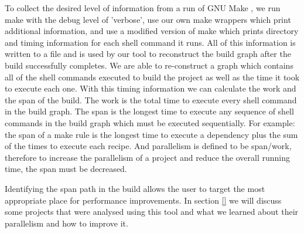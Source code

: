 \documentclass[sigplan,10pt,review,authorversion]{acmart}\settopmatter{printfolios=true,printccs=false,printacmref=false}
\begin{document}
To collect the desired level of information from a run of GNU Make \cite{}, we run make with the
debug level of 'verbose', use our own make wrappers which print additional information, and use
a modified version of make which prints directory and timing information for each shell command
it runs.  All of this information is written to a file and is used by our tool to reconstruct
the build graph after the build successfully completes.  We are able to re-construct a graph which
contains all of the shell commands executed to build the project as well as the time it took
to execute each one.  With this timing information we can calculate the work and the span of the
build.  The work is the total time to execute every shell command in the build graph.  The span is
the longest time to execute any sequence of shell commands in the build graph which must be
executed sequentially.  For example: the span of a make rule is the longest time to execute a
dependency plus the sum of the times to execute each recipe.  And parallelism is defined to be
span/work, therefore to increase the parallelism of a project and reduce the overall running time,
the span must be decreased.

Identifying the span path in the build allows the user to target the most appropriate place
for performance improvements.  In section \ref{} we will discuss some projects that were analysed
using this tool and what we learned about their parallelism and how to improve it.



\end{document}
